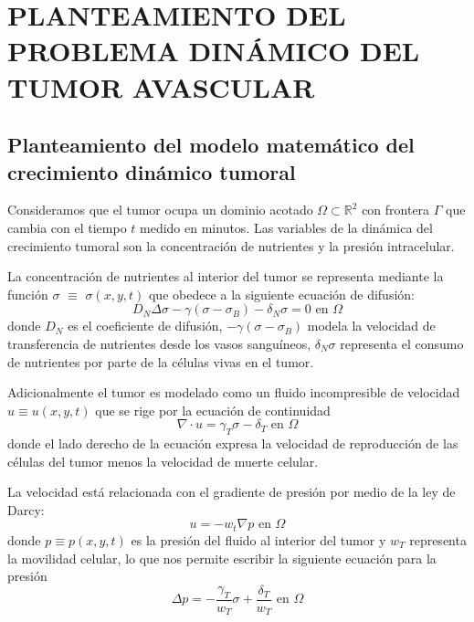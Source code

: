 \chapter{\MakeUppercase{Planteamiento del problema dinámico del tumor avascular}}
\thispagestyle{fancy}
\section{Planteamiento del modelo matemático del crecimiento dinámico tumoral}
Consideramos que el tumor ocupa un dominio acotado $\Omega\subset\mathbb{R}^2$ con frontera $\Gamma$  que cambia con el tiempo $t$ medido en minutos. Las variables de la dinámica del crecimiento tumoral son la concentración de nutrientes y la presión intracelular.

La concentración de nutrientes al interior del tumor se representa mediante la función $\sigma$ $\equiv$ $\sigma(x,y,t)$ que obedece a la siguiente ecuación de difusión:
\begin{equation}
	D_N \Delta \sigma - \gamma (\sigma -\sigma_B )-\delta_N \sigma=0 \text{ en } \Omega
\end{equation}
donde $D_N$ es el coeficiente de difusión, $- \gamma (\sigma -\sigma_B )$ modela la velocidad de transferencia de nutrientes desde los vasos sanguíneos,  $\delta_N \sigma$ representa el consumo de nutrientes  por parte de la células vivas en el tumor. 

Adicionalmente el tumor es modelado como un fluido incompresible de velocidad $u\equiv u(x,y,t)$ que se rige por la ecuación de continuidad
\begin{equation}
	\nabla \cdot u = \gamma_T \sigma - \delta _T\text{ en } \Omega
\end{equation}
donde el lado derecho de la ecuación expresa la velocidad de reproducción  de las células del tumor menos la velocidad de muerte celular.

La velocidad está relacionada con el gradiente de presión por medio de la ley de Darcy:
\begin{equation}
	u=-w_t \nabla p \text{ en } \Omega
\end{equation}
donde $p\equiv p(x,y,t)$ es la presión del fluido al interior del tumor y $w_T$ representa la movilidad celular, lo que nos permite escribir la siguiente ecuación para la presión 
\begin{equation}
	\Delta p = -\frac{\gamma_T}{w_T} \sigma + \frac{\delta _T}{w_T}\text{ en } \Omega
\end{equation}

